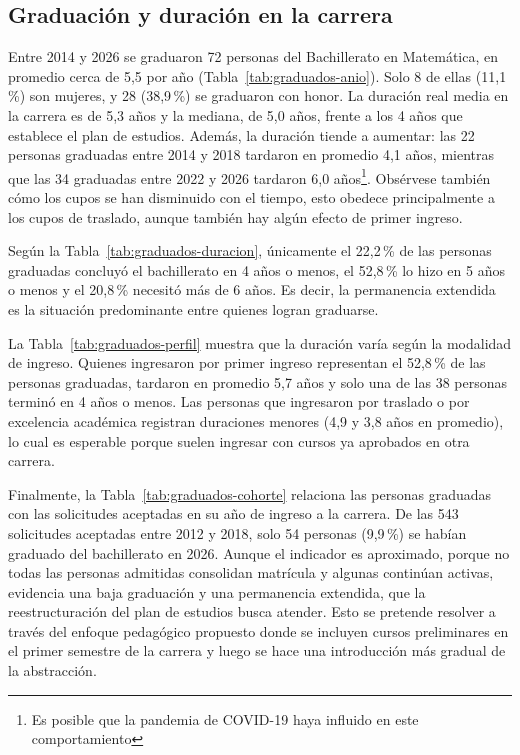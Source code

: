 \subsection{Graduación y duración en la carrera}

Entre 2014 y 2026 se graduaron 72 personas del Bachillerato en Matemática, en promedio cerca de 5,5 por año (Tabla~\ref{tab:graduados-anio}). Solo 8 de ellas (11,1\,\%) son mujeres, y 28 (38,9\,\%) se graduaron con honor. La duración real media en la carrera es de 5,3 años y la mediana, de 5,0 años, frente a los 4 años que establece el plan de estudios. Además, la duración tiende a aumentar: las 22 personas graduadas entre 2014 y 2018 tardaron en promedio 4,1 años, mientras que las 34 graduadas entre 2022 y 2026 tardaron 6,0 años\footnote{Es posible que la pandemia de COVID-19 haya influido en este comportamiento}. Obsérvese también cómo los cupos se han disminuido con el tiempo, esto obedece principalmente a los cupos de traslado, aunque también hay algún efecto de primer ingreso.

Según la Tabla~\ref{tab:graduados-duracion}, únicamente el 22,2\,\% de las personas graduadas concluyó el bachillerato en 4 años o menos, el 52,8\,\% lo hizo en 5 años o menos y el 20,8\,\% necesitó más de 6 años. Es decir, la permanencia extendida es la situación predominante entre quienes logran graduarse.

La Tabla~\ref{tab:graduados-perfil} muestra que la duración varía según la modalidad de ingreso. Quienes ingresaron por primer ingreso representan el 52,8\,\% de las personas graduadas, tardaron en promedio 5,7 años y solo una de las 38 personas terminó en 4 años o menos. Las personas que ingresaron por traslado o por excelencia académica registran duraciones menores (4,9 y 3,8 años en promedio), lo cual es esperable porque suelen ingresar con cursos ya aprobados en otra carrera.

Finalmente, la Tabla~\ref{tab:graduados-cohorte} relaciona las personas graduadas con las solicitudes aceptadas en su año de ingreso a la carrera. De las 543 solicitudes aceptadas entre 2012 y 2018, solo 54 personas (9,9\,\%) se habían graduado del bachillerato en 2026. Aunque el indicador es aproximado, porque no todas las personas admitidas consolidan matrícula y algunas continúan activas, evidencia una baja graduación y una permanencia extendida, que la reestructuración del plan de estudios busca atender. Esto se pretende resolver a través del enfoque pedagógico propuesto donde se incluyen cursos preliminares en el primer semestre de la carrera y luego se hace una introducción más gradual de la abstracción.

